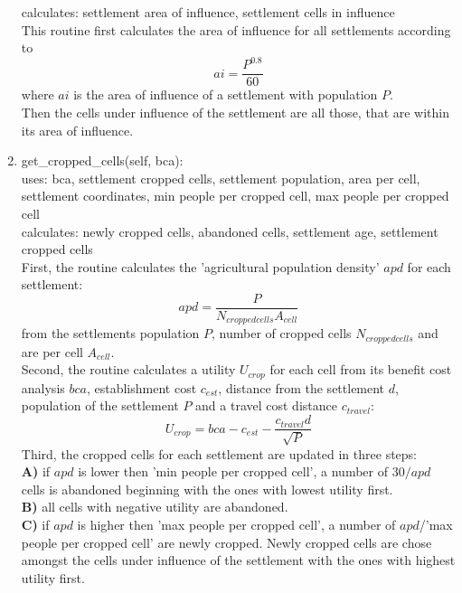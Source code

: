 \begin{enumerate}
		calculates: settlement area of influence, settlement cells in influence\\
		This routine first calculates the area of influence for all settlements according to
		\begin{equation}
			ai = \frac{P^{0.8}}{60}
			\label{are_of_influence}
		\end{equation}
		where $ai$ is the area of influence of a settlement with population $P$.\\
		Then the cells under influence of the settlement are all those, that are within its area of influence.
	\item get_cropped_cells(self, bca): \\
		uses: bca, settlement cropped cells, settlement population, area per cell, settlement coordinates, min people per cropped cell, max people per cropped cell\\
		calculates: newly cropped cells, abandoned cells, settlement age, settlement cropped cells \\
		First, the routine calculates the 'agricultural population density' $apd$ for each settlement:
		\begin{equation}
			apd = \frac{P}{N_{cropped cells} A_{cell}}
			\label{apd}
		\end{equation}
		from the settlements population $P$, number of cropped cells $N_{cropped cells}$ and are per cell $A_{cell}$. \\
		Second, the routine calculates a utility $U_{crop}$ for each cell from its benefit cost analysis $bca$, establishment cost $c_{est}$, distance from the settlement $d$, population of the settlement $P$ and a travel cost distance $c_{travel}$:
		\begin{equation}
			U_{crop} = bca - c_{est} - \frac{c_{travel} d}{\sqrt{P}}
			\label{U_crop}
		\end{equation}
		Third, the cropped cells for each settlement are updated in three steps: \\
		\textbf{A)} if $apd$ is lower then 'min people per cropped cell', a number of $30/apd$ cells is abandoned beginning with the ones with lowest utility first. \\
		\textbf{B)} all cells with negative utility are abandoned. \\
		\textbf{C)} if $apd$ is higher then 'max people per cropped cell', a number of $apd$/'max people per cropped cell' are newly cropped. Newly cropped cells are chose amongst the cells under influence of the settlement with the ones with highest utility first. \\

\end{enumerate}
